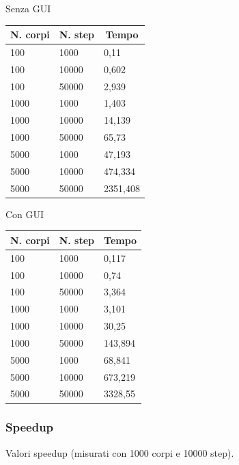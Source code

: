 \documentclass[12pt,a4paper,oneside]{article}
\begin{document}
	\hfill
	\begin{minipage}{.4\textwidth}
		Senza GUI
		
		\begin{tabular}{|l|l|l|}
			\hline
			\multicolumn{1}{|c|}{\textbf{N. corpi}} & \multicolumn{1}{c|}{\textbf{N. step}} & \multicolumn{1}{c|}{\textbf{Tempo}} \\ \hline
			100 & 1000 & 0,11 \\ \hline
			100 & 10000 & 0,602 \\ \hline
			100 & 50000 & 2,939 \\ \hline
			1000 & 1000 & 1,403 \\ \hline
			1000 & 10000 & 14,139 \\ \hline
			1000 & 50000 & 65,73 \\ \hline
			5000 & 1000 & 47,193 \\ \hline
			5000 & 10000 & 474,334 \\ \hline
			5000 & 50000 & 2351,408 \\ \hline
		\end{tabular}
	\end{minipage}
	\hfill
	\begin{minipage}{.4\textwidth}
		Con GUI
		
		\begin{tabular}{|l|l|l|}
			\hline
			\multicolumn{1}{|c|}{\textbf{N. corpi}} & \multicolumn{1}{c|}{\textbf{N. step}} & \multicolumn{1}{c|}{\textbf{Tempo}} \\ \hline
			100 & 1000 & 0,117 \\ \hline
			100 & 10000 & 0,74 \\ \hline
			100 & 50000 & 3,364 \\ \hline
			1000 & 1000 & 3,101 \\ \hline
			1000 & 10000 & 30,25 \\ \hline
			1000 & 50000 & 143,894 \\ \hline
			5000 & 1000 & 68,841 \\ \hline
			5000 & 10000 & 673,219 \\ \hline
			5000 & 50000 & 3328,55 \\ \hline
		\end{tabular}
	\end{minipage}
	\hfill

	\subsubsection{Speedup}
	Valori speedup (misurati con 1000 corpi e 10000 step).
	
\end{document}
